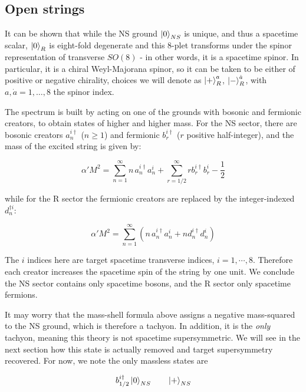 \subsection{Open strings}

It can be shown that while the NS ground $\ket{0}_{NS}$ is unique, and thus a spacetime scalar, $\ket{0}_R$ is eight-fold degenerate and this 8-plet transforms under the spinor representation of transverse $SO(8)$ - in other words, it is a spacetime spinor. In particular, it is a chiral Weyl-Majorana spinor, so it can be taken to be either of positive or negative chirality, choices we will denote as $\ket{+}^a_R$, $\ket{-}^{\dot a}_R$, with $a,\dot{a}=1,\ldots,8$ the spinor index.

The spectrum is built by acting on one of the grounds with bosonic and fermionic creators, to obtain states of higher and higher mass. For the NS sector, there are bosonic creators $a_n^{i\dagger}$ ($n\geq 1$) and fermionic $b_r^{i\dagger}$ ($r$ positive half-integer), and the mass of the excited string is given by:

\begin{equation}
	\alpha' M^2 = \sum_{n=1}^\infty n \,a_n^{i\dagger} a_n^i  + \sum_{r=1/2}^\infty r b_r^{i\dagger} b_r^i - \frac{1}{2}
	\label{}
\end{equation}

while for the R sector the fermionic creators are replaced by the integer-indexed $d_n^{\dagger i}$:

\begin{equation}
	\alpha' M^2 = \sum_{n=1}^\infty \left(n\, a_n^{i\dagger} a_n^i + n d_n^{i\dagger} d_n^i \right)
	\label{}
\end{equation}

The $i$ indices here are target spacetime transverse indices, $i=1,\cdots,8$. Therefore each creator increases the spacetime spin of the string by one unit. We conclude the NS sector contains only spacetime bosons, and the R sector only spacetime fermions.

It may worry that the mass-shell formula above assigns a negative mass-squared to the NS ground, which is therefore a tachyon. In addition, it is the \emph{only} tachyon, meaning this theory is not spacetime supersymmetric. We will see in the next section how this state is actually removed and target supersymmetry recovered. For now, we note the only massless states are

\begin{equation}
	b_{1/2}^{i\dagger} \ket{0}_{NS} \quad \quad \ket{+}_{NS}
	\label{openmassless}
\end{equation}

